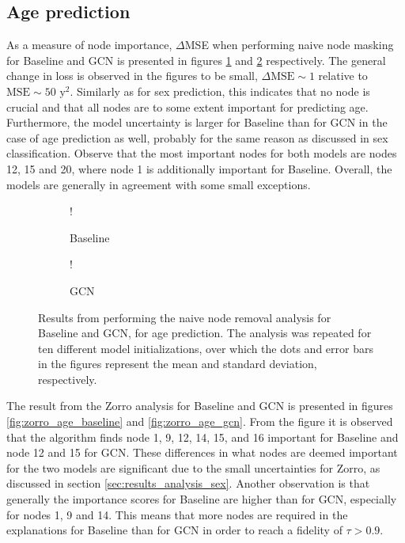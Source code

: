 \subsection{Age prediction}
As a measure of node importance, $\Delta$MSE when performing naive node masking for Baseline and GCN is presented in figures \ref{fig:naive_age_baseline} and \ref{fig:naive_age_gcn} respectively. The general change in loss is observed in the figures to be small, $\Delta\text{MSE}\sim1$ relative to $\text{MSE}\sim50\text{ y}^2$. Similarly as for sex prediction, this indicates that no node is crucial and that all nodes are to some extent important for predicting age. Furthermore, the model uncertainty is larger for Baseline than for GCN in the case of age prediction as well, probably for the same reason as discussed in sex classification. Observe that the most important nodes for both models are nodes 12, 15 and 20, where node 1 is additionally important for Baseline. Overall, the models are generally in agreement with some small exceptions. 
\begin{figure}[H]
    \centering
        \begin{subfigure}{.5\textwidth}
            \centering
            \begin{center}
                \resizebox {1.0\linewidth} {!} {
                    
                }
            \end{center}
            \caption{Baseline}
            \label{fig:naive_age_baseline}
        \end{subfigure}%
        \begin{subfigure}{.5\textwidth}
            \centering
            \begin{center}
                \resizebox {1.0\linewidth} {!} {
                    
                }
            \end{center}
            \caption{GCN}
            \label{fig:naive_age_gcn}
        \end{subfigure}
    \caption{Results from performing the naive node removal analysis for Baseline and GCN, for age prediction. The analysis was repeated for ten different model initializations, over which the dots and error bars in the figures represent the mean and standard deviation, respectively.}
    \label{fig:naive_age}
\end{figure}
The result from the Zorro analysis for Baseline and GCN is presented in figures \ref{fig:zorro_age_baseline} and \ref{fig:zorro_age_gcn}. From the figure it is observed that the algorithm finds node 1, 9, 12, 14, 15, and 16 important for Baseline and node 12 and 15 for GCN. These differences in what nodes are deemed important for the two models are significant due to the small uncertainties for Zorro, as discussed in section \ref{sec:results_analysis_sex}. Another observation is that generally the importance scores for Baseline are higher than for GCN, especially for nodes 1, 9 and 14. This means that more nodes are required in the explanations for Baseline than for GCN in order to reach a fidelity of $\tau>0.9$.

